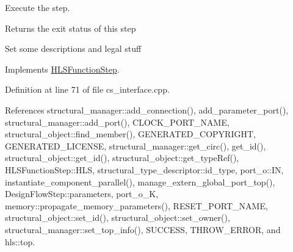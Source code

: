 Execute the step. 

\begin{DoxyReturn}{Returns}
the exit status of this step 
\end{DoxyReturn}
Set some descriptions and legal stuff 

Implements \hyperlink{classHLSFunctionStep_a8db4c00d080655984d98143206fc9fa8}{H\+L\+S\+Function\+Step}.



Definition at line 71 of file cs\+\_\+interface.\+cpp.



References structural\+\_\+manager\+::add\+\_\+connection(), add\+\_\+parameter\+\_\+port(), structural\+\_\+manager\+::add\+\_\+port(), C\+L\+O\+C\+K\+\_\+\+P\+O\+R\+T\+\_\+\+N\+A\+ME, structural\+\_\+object\+::find\+\_\+member(), G\+E\+N\+E\+R\+A\+T\+E\+D\+\_\+\+C\+O\+P\+Y\+R\+I\+G\+HT, G\+E\+N\+E\+R\+A\+T\+E\+D\+\_\+\+L\+I\+C\+E\+N\+SE, structural\+\_\+manager\+::get\+\_\+circ(), get\+\_\+id(), structural\+\_\+object\+::get\+\_\+id(), structural\+\_\+object\+::get\+\_\+type\+Ref(), H\+L\+S\+Function\+Step\+::\+H\+LS, structural\+\_\+type\+\_\+descriptor\+::id\+\_\+type, port\+\_\+o\+::\+IN, instantiate\+\_\+component\+\_\+parallel(), manage\+\_\+extern\+\_\+global\+\_\+port\+\_\+top(), Design\+Flow\+Step\+::parameters, port\+\_\+o\+\_\+K, memory\+::propagate\+\_\+memory\+\_\+parameters(), R\+E\+S\+E\+T\+\_\+\+P\+O\+R\+T\+\_\+\+N\+A\+ME, structural\+\_\+object\+::set\+\_\+id(), structural\+\_\+object\+::set\+\_\+owner(), structural\+\_\+manager\+::set\+\_\+top\+\_\+info(), S\+U\+C\+C\+E\+SS, T\+H\+R\+O\+W\+\_\+\+E\+R\+R\+OR, and hls\+::top.

